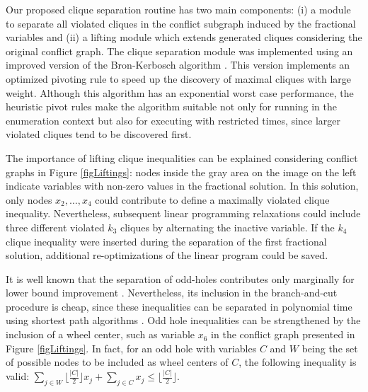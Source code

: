 \documentclass{endm}
\begin{document}
Our proposed clique separation routine has two main components: (i) a module to separate all violated cliques in the conflict subgraph induced by the fractional variables and (ii) a lifting module which extends generated cliques considering the original conflict graph. The clique separation module was implemented using an improved version of the Bron-Kerbosch algorithm \cite{Bron1973}. This version implements an optimized pivoting rule \cite{Brito2011} to speed up the discovery of maximal cliques with large weight.  Although this algorithm has an exponential worst case performance, the heuristic pivot rules  make the algorithm suitable not only for running in the enumeration context but also for executing with restricted times, since larger violated cliques tend to be discovered first. 

The importance of lifting clique inequalities can be explained considering conflict graphs in Figure \ref{figLiftings}: nodes inside the gray area on the image on the left indicate variables with non-zero values in the fractional solution. In this solution, only nodes $x_{2},\ldots,x_{4}$ could contribute to define a maximally violated clique inequality. Nevertheless, subsequent linear programming relaxations could include three different violated $k_{3}$ cliques by alternating the inactive variable. If the $k_{4}$ clique inequality were inserted during the separation of the first fractional solution, additional re-optimizations of the linear program could be saved. 

It is well known that the separation of odd-holes contributes only marginally for lower bound improvement \cite{Borndorfer1998,Mendez-Diaz2008}. Nevertheless, its inclusion in the branch-and-cut procedure is cheap, since these inequalities can be separated in polynomial time using shortest path algorithms \cite{Grotschel1993}. Odd hole inequalities can be strengthened by the inclusion of a wheel center, such as variable $x_{6}$ in the conflict graph presented in Figure \ref{figLiftings}. In fact, for an odd hole with variables $C$ and $W$ being the set of possible nodes to be included as wheel centers of $C$, the following inequality is valid: $\displaystyle \sum_{j \in W} \lfloor \frac{|C|}{2} \rfloor x_{j} + \sum_{j \in C} x_{j} \leq \lfloor \frac{|C|}{2} \rfloor$.

\begin{figure}
\begin{center}
\label{figOH}
\end{center}
\end{figure}
\end{document}
